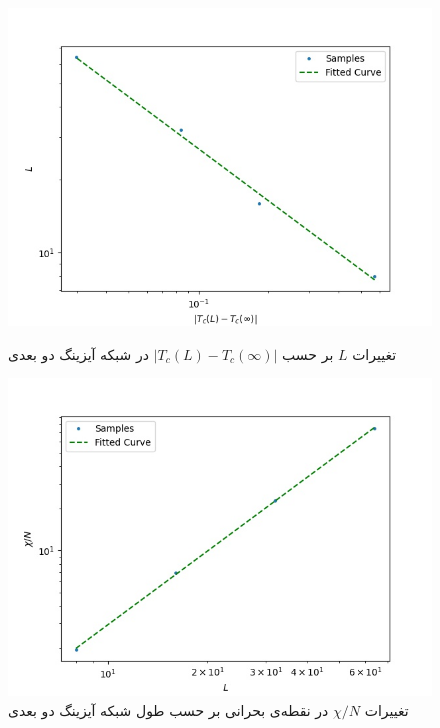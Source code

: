 \documentclass[11pt, a4paper]{article}
\begin{document}
\begin{figure}[h!]
	\centering
  \begin{minipage}[b]{0.48\textwidth}
    \includegraphics[width=\textwidth]{nu.jpg}
    \caption{تغییرات $L$ بر حسب $|T_c(L) - T_c(\infty)|$ در شبکه آیزینگ دو بعدی}
    \label{fig:l_T}
  \end{minipage}
  \hfill
  \begin{minipage}[b]{0.48\textwidth}
    \includegraphics[width=\textwidth]{gamma.jpg}
    \caption{تغییرات $\chi / N$ در نقطه‌ی بحرانی بر حسب طول شبکه آیزینگ دو بعدی}
    \label{fig:xi_l}
  \end{minipage}
  \begin{minipage}[b]{0.48\textwidth}

\end{minipage}
\end{figure}
\end{document}
